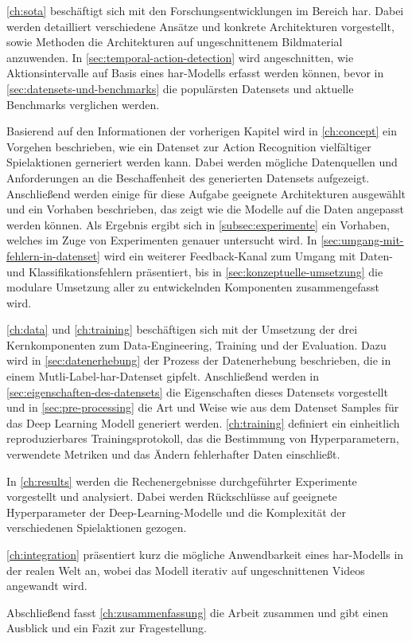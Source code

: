 \autoref{ch:sota} beschäftigt sich mit den Forschungsentwicklungen im Bereich \gls{har}.
Dabei werden detailliert verschiedene Ansätze und konkrete Architekturen vorgestellt, sowie Methoden die Architekturen auf ungeschnittenem Bildmaterial anzuwenden.
In \autoref{sec:temporal-action-detection} wird angeschnitten, wie Aktionsintervalle auf Basis eines \gls{har}-Modells erfasst werden können, bevor in \autoref{sec:datensets-und-benchmarks} die populärsten Datensets und aktuelle Benchmarks verglichen werden.

Basierend auf den Informationen der vorherigen Kapitel wird in \autoref{ch:concept} ein Vorgehen beschrieben, wie ein Datenset zur Action Recognition vielfältiger Spielaktionen gerneriert werden kann.
Dabei werden mögliche Datenquellen und Anforderungen an die Beschaffenheit des generierten Datensets aufgezeigt.
Anschließend werden einige für diese Aufgabe geeignete Architekturen ausgewählt und ein Vorhaben beschrieben, das zeigt wie die Modelle auf die Daten angepasst werden können.
Als Ergebnis ergibt sich in \autoref{subsec:experimente} ein Vorhaben, welches im Zuge von Experimenten genauer untersucht wird.
In \autoref{sec:umgang-mit-fehlern-in-datenset} wird ein weiterer Feedback-Kanal zum Umgang mit Daten- und Klassifikationsfehlern präsentiert, bis in \autoref{sec:konzeptuelle-umsetzung} die modulare Umsetzung aller zu entwickelnden Komponenten zusammengefasst wird.

\autoref{ch:data} und \autoref{ch:training} beschäftigen sich mit der Umsetzung der drei Kernkomponenten zum Data-Engineering, Training und der Evaluation.
Dazu wird in \autoref{sec:datenerhebung} der Prozess der Datenerhebung beschrieben, die in einem Mutli-Label-\gls{har}-Datenset gipfelt.
Anschließend werden in \autoref{sec:eigenschaften-des-datensets} die Eigenschaften dieses Datensets vorgestellt und in \autoref{sec:pre-processing} die Art und Weise wie aus dem Datenset Samples für das Deep Learning Modell generiert werden.
\autoref{ch:training} definiert ein einheitlich reproduzierbares Trainingsprotokoll, das die Bestimmung von Hyperparametern, verwendete Metriken und das Ändern fehlerhafter Daten einschließt.

In \autoref{ch:results} werden die Rechenergebnisse durchgeführter Experimente vorgestellt und analysiert.
Dabei werden Rückschlüsse auf geeignete Hyperparameter der Deep-Learning-Modelle und die Komplexität der verschiedenen Spielaktionen gezogen.

\autoref{ch:integration} präsentiert kurz die mögliche Anwendbarkeit eines \gls{har}-Modells in der realen Welt an, wobei das Modell iterativ auf ungeschnittenen Videos angewandt wird.

Abschließend fasst \autoref{ch:zusammenfassung} die Arbeit zusammen und gibt einen Ausblick und ein Fazit zur Fragestellung.
